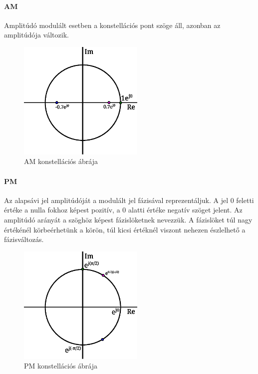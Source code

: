 \documentclass[12pt,a4paper]{article}
\begin{document}
\paragraph{AM}
Amplitúdó modulált esetben a konstellációs pont szöge áll, azonban az amplitúdója változik.
\begin{figure}[H]
\begin{center}
\includegraphics[width=6cm]{figures/modulaciok_workshop_konst_am_2.eps}
\caption{AM konstellációs ábrája}
\label{fig:konstam}
\end{center}
\end{figure}
\paragraph{PM}
Az alapsávi jel amplitúdóját a modulált jel fázisával reprezentáljuk. A jel 0 feletti értéke a nulla fokhoz képest pozitív, a 0 alatti értéke negatív szöget jelent. Az amplitúdó arányát a szöghöz képest fázislöketnek nevezzük. A fázislöket túl nagy értékénél körbeérhetünk a körön, túl kicsi értéknél viszont nehezen észlelhető a fázisváltozás.
\begin{figure}[H]
\begin{center}
\includegraphics[width=6cm]{figures/modulaciok_workshop_konst_pm_2.eps}
\caption{PM konstellációs ábrája}
\label{fig:konstpm}
\end{center}
\end{figure}
\end{document}
